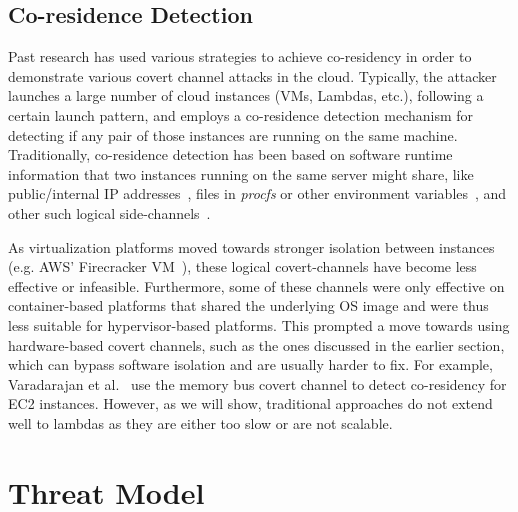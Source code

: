 \subsection{Co-residence Detection}
\label{sec:background:pastwork}

 Past research has used various strategies to achieve co-residency in order 
to demonstrate various covert channel attacks in the cloud. Typically, the
attacker launches a large number of cloud instances (VMs, Lambdas, etc.),
following a certain launch pattern, and employs a co-residence detection
mechanism for detecting if any pair of those instances are running on the same
machine. Traditionally, co-residence detection has been based on software
runtime information that two instances running on the same server might share,
like public/internal IP addresses~\cite{ristenpartccs2009}, files in
\textit{procfs} or other environment
variables~\cite{wangusenix2018,wuusenix2012}, and other such logical
side-channels~\cite{varad191016,vmplacement}.

As virtualization platforms moved towards stronger isolation between instances (e.g.
AWS' Firecracker VM~\cite{firecracker}), these logical covert-channels have
become less effective or infeasible. Furthermore, some of these channels were
only effective on container-based platforms that shared the underlying OS image
and were thus less suitable for hypervisor-based platforms.  This prompted a
move towards using hardware-based covert channels, such as the ones discussed in
the earlier section, which can bypass software isolation and are usually harder
to fix. For example, Varadarajan et al.~\cite{varadarajan2015} use the memory
bus covert channel to detect co-residency for EC2 instances.  However, as we
will show, traditional approaches do not extend well to lambdas as they are either too
slow or are not scalable. 


\section{Threat Model}
\label{sec:threatmodel}
\todo{}
